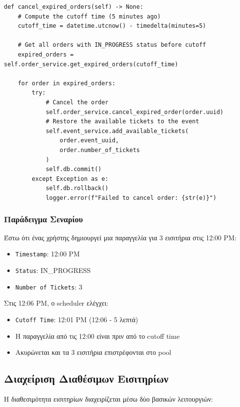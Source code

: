 \documentclass[12pt,a4paper]{report}
\begin{document}
\begin{lstlisting}[caption=Order Cleanup Logic]
def cancel_expired_orders(self) -> None:
    # Compute the cutoff time (5 minutes ago)
    cutoff_time = datetime.utcnow() - timedelta(minutes=5)
    
    # Get all orders with IN_PROGRESS status before cutoff
    expired_orders = self.order_service.get_expired_orders(cutoff_time)
    
    for order in expired_orders:
        try:
            # Cancel the order
            self.order_service.cancel_expired_order(order.uuid)
            # Restore the available tickets to the event
            self.event_service.add_available_tickets(
                order.event_uuid, 
                order.number_of_tickets
            )
            self.db.commit()
        except Exception as e:
            self.db.rollback()
            logger.error(f"Failed to cancel order: {str(e)}")
\end{lstlisting}

\subsubsection{Παράδειγμα Σεναρίου}

Έστω ότι ένας χρήστης δημιουργεί μια παραγγελία για 3 εισιτήρια στις 12:00 PM:
\begin{itemize}
    \item \texttt{Timestamp}: 12:00 PM
    \item \texttt{Status}: IN\_PROGRESS
    \item \texttt{Number of Tickets}: 3
\end{itemize}

Στις 12:06 PM, ο scheduler ελέγχει:
\begin{itemize}
    \item \texttt{Cutoff Time}: 12:01 PM (12:06 - 5 λεπτά)
    \item Η παραγγελία από τις 12:00 είναι πριν από το cutoff time
    \item Ακυρώνεται και τα 3 εισιτήρια επιστρέφονται στο pool
\end{itemize}

\subsection{Διαχείριση Διαθέσιμων Εισιτηρίων}

Η διαθεσιμότητα εισιτηρίων διαχειρίζεται μέσω δύο βασικών λειτουργιών:
\end{document}
